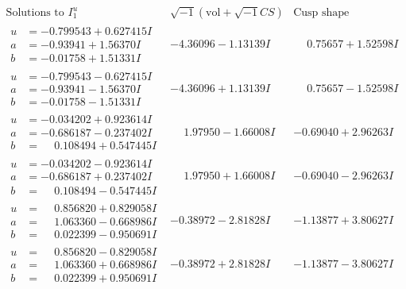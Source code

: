 \documentclass[1p]{elsarticle_modified}
\theoremstyle{definition}
\newcommand{\I}{\sqrt{-1}}
\begin{document}
$$\begin{array}{c|c|c}  
\text{Solutions to }I^u_{1}& \I (\text{vol} + \sqrt{-1}CS) & \text{Cusp shape}\\
 \hline 
\begin{aligned}
u &= -0.799543 + 0.627415 I \\
a &= -0.93941 + 1.56370 I \\
b &= -0.01758 + 1.51331 I\end{aligned}
 & -4.36096 - 1.13139 I & \phantom{-}0.75657 + 1.52598 I \\ \hline\begin{aligned}
u &= -0.799543 - 0.627415 I \\
a &= -0.93941 - 1.56370 I \\
b &= -0.01758 - 1.51331 I\end{aligned}
 & -4.36096 + 1.13139 I & \phantom{-}0.75657 - 1.52598 I \\ \hline\begin{aligned}
u &= -0.034202 + 0.923614 I \\
a &= -0.686187 - 0.237402 I \\
b &= \phantom{-}0.108494 + 0.547445 I\end{aligned}
 & \phantom{-}1.97950 - 1.66008 I & -0.69040 + 2.96263 I \\ \hline\begin{aligned}
u &= -0.034202 - 0.923614 I \\
a &= -0.686187 + 0.237402 I \\
b &= \phantom{-}0.108494 - 0.547445 I\end{aligned}
 & \phantom{-}1.97950 + 1.66008 I & -0.69040 - 2.96263 I \\ \hline\begin{aligned}
u &= \phantom{-}0.856820 + 0.829058 I \\
a &= \phantom{-}1.063360 - 0.668986 I \\
b &= \phantom{-}0.022399 - 0.950691 I\end{aligned}
 & -0.38972 - 2.81828 I & -1.13877 + 3.80627 I \\ \hline\begin{aligned}
u &= \phantom{-}0.856820 - 0.829058 I \\
a &= \phantom{-}1.063360 + 0.668986 I \\
b &= \phantom{-}0.022399 + 0.950691 I\end{aligned}
 & -0.38972 + 2.81828 I & -1.13877 - 3.80627 I \\ \hline\begin{aligned}

\end{aligned}
\end{array}$$
\end{document}
